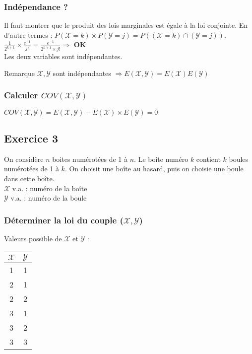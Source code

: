 \documentclass[a4paper, 12pt]{article}
\begin{document}
\subsubsection{Indépendance ?}
Il faut montrer que le produit des lois marginales est égale à la loi conjointe. En d'autre termes : $P (\mathcal{X} = k) \times P (\mathcal{Y} = j) = P ((\mathcal{X} = k) \cap (\mathcal{Y} = j))$.\\

$\frac{1}{2^{k+1}} \times \frac{e^{-1}}{j!} = \frac{e^{-1}}{2^{k+1} \times j!} \Rightarrow$ \textbf{OK} \checkmark \\
Les deux variables sont indépendantes.

\begin{remarque}{Remarque}
$\mathcal{X, Y}$ sont indépendantes $\Rightarrow E (\mathcal{X, Y}) = E (\mathcal{X}) E (\mathcal{Y})$
\end{remarque}


\subsubsection{Calculer $COV(\mathcal{X, Y})$}
$COV (\mathcal{X, Y}) = E (\mathcal{X, Y}) - E (\mathcal{X}) \times E (\mathcal{Y}) = 0$


\subsection{Exercice 3}
On considère $n$ boites numérotées de 1 à $n$. Le boite numéro $k$ contient $k$ boules numérotées de 1 à $k$. On choisit une boîte au hasard, puis on choisie une boule dans cette boîte.\\
$\mathcal{X}$ v.a. : numéro de la boîte\\
$\mathcal{Y}$ v.a. : numéro de la boule

\subsubsection{Déterminer la loi du couple ($\mathcal{X, Y}$)}
Valeurs possible de $\mathcal{X}$ et $\mathcal{Y}$ :
{
\Large
\begin{center}
\begin{tabular}{c|c}
	$\mathcal{X}$ & $\mathcal{Y}$ \\
	\hline
	1 & 1 \\
	2 & 1 \\
	2 & 2 \\
	3 & 1 \\
	3 & 2 \\
	3 & 3 \\
\end{tabular}\\
\end{center}
}
\end{document}
